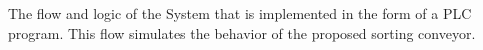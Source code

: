 The flow and logic of the System that is implemented in the form of a PLC program. This flow simulates the behavior of the proposed sorting conveyor.

